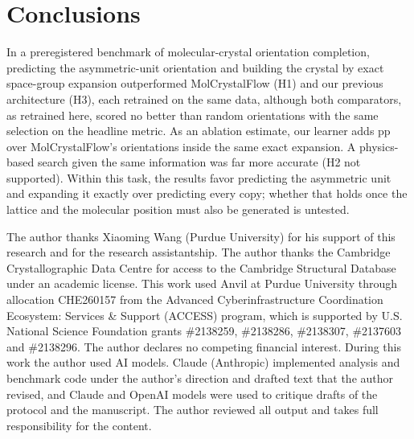 \documentclass[journal=acsodf,manuscript=article]{achemso}
\newcounter{todocount}
\DeclareRobustCommand{\TODO}[1]{\stepcounter{todocount}\textcolor{red}{[TODO: #1]}}
\begin{document}
\section{Conclusions}
In a preregistered benchmark of molecular-crystal orientation completion, predicting the
asymmetric-unit orientation and building the crystal by exact space-group expansion
outperformed MolCrystalFlow (H1) and our previous architecture (H3), each retrained on the
same data, although both comparators, as retrained here, scored no better than random
orientations with the same selection on the headline metric. As an ablation estimate, our
learner adds \nLearnDelta{} pp \nLearnCI{} over MolCrystalFlow's orientations inside the same
exact expansion. A physics-based search given the same information was far more accurate (H2
not supported). Within this task, the results favor predicting the asymmetric unit and
expanding it exactly over predicting every copy; whether that holds once the lattice and the
molecular position must also be generated is untested.

\IfFileExists{sections/methods.tex}{}{\section{Methods}\TODO{sections/methods.tex}}

\begin{acknowledgement}
The author thanks Xiaoming Wang (Purdue University) for his support of this research and
for the research assistantship. The author thanks the Cambridge Crystallographic Data
Centre for access to the Cambridge
Structural Database under an academic license. This work used Anvil\cite{song2022anvil}
at Purdue University through allocation CHE260157 from the Advanced Cyberinfrastructure
Coordination Ecosystem: Services \& Support (ACCESS) program\cite{boerner2023access}, which
is supported by U.S. National Science Foundation grants \#2138259, \#2138286, \#2138307,
\#2137603 and \#2138296. The author declares no competing financial
interest. During this work the author used AI models. Claude (Anthropic) implemented
analysis and benchmark code under the author's direction and drafted text that the author
revised, and Claude and OpenAI models were used to critique drafts of the protocol and the
manuscript. The author reviewed all output and takes full responsibility for the content.
\end{acknowledgement}
\end{document}
